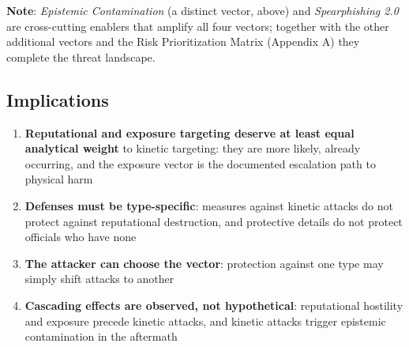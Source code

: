 \documentclass[11pt,letterpaper]{article}
\begin{document}
\textbf{Note}: \textit{Epistemic Contamination} (a distinct vector, above) and \textit{Spearphishing 2.0} are cross-cutting enablers that amplify all four vectors; together with the other additional vectors and the Risk Prioritization Matrix (Appendix A) they complete the threat landscape.

\subsection{Implications}

\begin{enumerate}
  \item \textbf{Reputational and exposure targeting deserve at least equal analytical weight} to kinetic targeting: they are more likely, already occurring, and the exposure vector is the documented escalation path to physical harm
  \item \textbf{Defenses must be type-specific}: measures against kinetic attacks do not protect against reputational destruction, and protective details do not protect officials who have none
  \item \textbf{The attacker can choose the vector}: protection against one type may simply shift attacks to another
  \item \textbf{Cascading effects are observed, not hypothetical}: reputational hostility and exposure precede kinetic attacks, and kinetic attacks trigger epistemic contamination in the aftermath
\end{enumerate}
\end{document}
